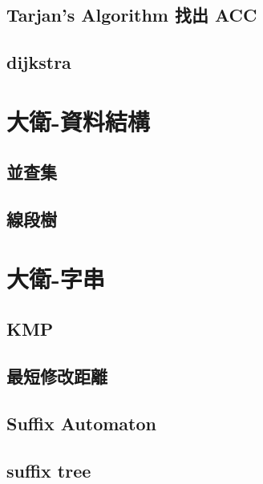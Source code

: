 \subsection{Tarjan's Algorithm 找出 ACC}
\raggedbottom
\hrulefill
\subsection{dijkstra}
\raggedbottom
\hrulefill

\section{大衛-資料結構}
\subsection{並查集}
\raggedbottom
\hrulefill
\subsection{線段樹}
\raggedbottom
\hrulefill

\section{大衛-字串}
\subsection{KMP}
\raggedbottom
\hrulefill
\subsection{最短修改距離}
\raggedbottom
\hrulefill
\subsection{Suffix Automaton}
\raggedbottom
\hrulefill
\subsection{suffix tree}
\raggedbottom
\hrulefill

